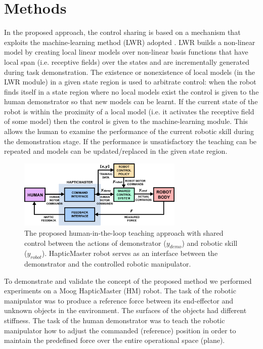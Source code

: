\section{Methods}
In the proposed approach, the control sharing is based on a mechanism that exploits the machine-learning method (LWR) adopted \cite{Schaal1998,Vijayakumar2005}. LWR builds a non-linear model by creating local linear models over non-linear basis functions that have local span (i.e. receptive fields) over the states and are incrementally generated during task demonstration. The existence or nonexistence of local models (in the LWR module) in a given state region is used to arbitrate control: when the robot finds itself in a state region where no local models exist the control is given to the human demonstrator so that new models can be learnt. If the current state of the robot is within the proximity of a local model (i.e. it activates the receptive field of some model) then the control is given to the machine-learning module. This allows the human to examine the performance of the current robotic skill during the demonstration stage. If the performance is unsatisfactory the teaching can be repeated and models can be updated/replaced in the given state region.
\begin{figure}[!t]
  \centering
  \includegraphics[width=0.70\textwidth]{Luka/scheme.eps}
  \caption{The proposed human-in-the-loop teaching approach with shared control between the actions of demonstrator ($y_{demo}$) and robotic skill ($y_{robot}$). HapticMaster robot serves as an interface between the demonstrator and the controlled robotic manipulator.}
  \label{fig:scheme}
  \vspace{-4 mm}
\end{figure}

To demonstrate and validate the concept of the proposed method we performed experiments on a Moog HapticMaster (HM) robot. The task of the robotic manipulator was to produce a reference force between its end-effector and unknown objects in the environment. The surfaces of the objects had different stiffness. The task of the human demonstrator was to teach the robotic manipulator how to adjust the commanded (reference) position in order to maintain the predefined force over the entire operational space (plane).

